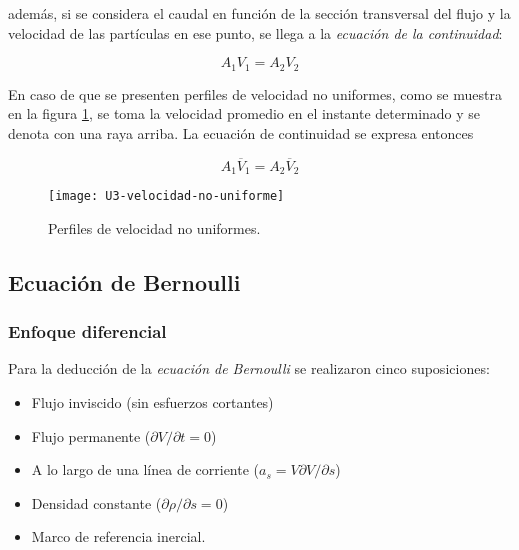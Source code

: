 además, si se considera el caudal en función de la sección transversal del flujo y la velocidad de las partículas en ese punto, se llega a la \emph{ecuación de la continuidad}:

\begin{equation}
	A_1  V_1 = A_2 V_2
	\label{eq:continuidad-1}
\end{equation}


En caso de que se presenten perfiles de velocidad no uniformes, como se muestra en la figura \ref{fig:velocidad-no-uniforme}, se toma la velocidad promedio en el instante determinado y se denota con una raya arriba. La ecuación de continuidad se expresa entonces

\begin{equation}
	A_1 \overline{V}_1= A_2  \overline{V}_2
	\label{eq:continuidad-2}
\end{equation} 

\begin{figure}[H]
	\centering
	\texttt{[image: U3-velocidad-no-uniforme]}
	\caption{Perfiles de velocidad no uniformes.}
	\label{fig:velocidad-no-uniforme}
\end{figure}


\subsection{Ecuación de Bernoulli}
\subsubsection{Enfoque diferencial}

Para la deducción de la \emph{ecuación de Bernoulli} se realizaron cinco suposiciones:
\begin{itemize}
	\item Flujo inviscido (sin esfuerzos cortantes)\vspace{-.2cm}
	\item Flujo permanente ($\partial V / \partial t = 0$)\vspace{-.2cm}
	\item A lo largo de una línea de corriente ($a_s = V \partial V / \partial s$)\vspace{-.2cm}
	\item Densidad constante ($\partial \rho / \partial s = 0$)\vspace{-.2cm}
	\item Marco de referencia inercial.
\end{itemize}


